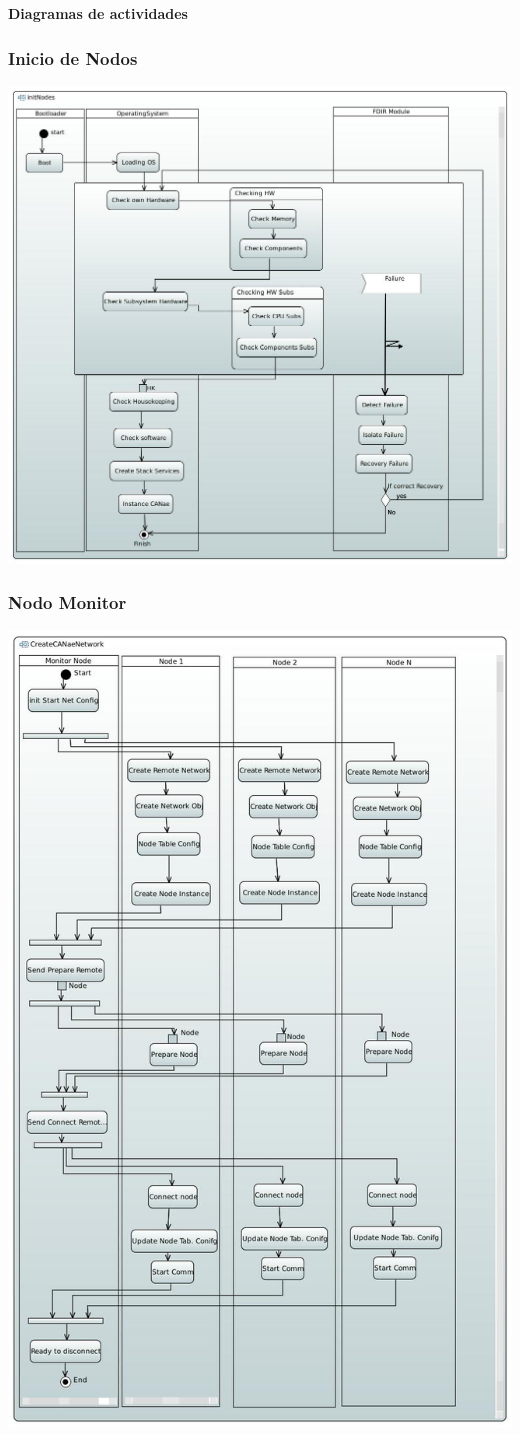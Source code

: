 \begin{frame}[c]
	\centering
	\LARGE \textbf{Diagramas de actividades}
\end{frame}

\begin{frame}[c]
	\frametitle{Inicio de Nodos}
	\centering
	\includegraphics[scale=0.4]{images/initNodes.JPG}
\end{frame}

\begin{frame}[c]
	\frametitle{Nodo Monitor}
	\centering
	\includegraphics[scale=0.4]{images/NodeMonitor.JPG}
\end{frame}